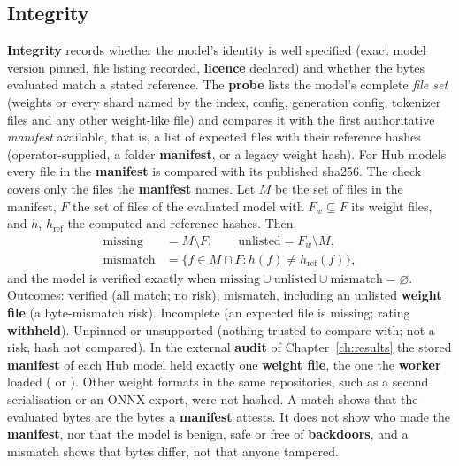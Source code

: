 \subsection{Integrity}\label{sec:integ}
\textbf{Integrity} records whether the model's identity is well specified (exact model version pinned, file listing recorded, \textbf{licence} declared) and whether the bytes evaluated match a stated reference. The \textbf{probe} lists the model's complete \emph{file set} (weights or every shard named by the index, config, generation config, tokenizer files and any other weight-like file) and compares it with the first authoritative \emph{manifest} available, that is, a list of expected files with their reference hashes (operator-supplied, a folder \textbf{manifest}, or a legacy weight hash). For Hub models every file in the \textbf{manifest} is compared with its published sha256. The check covers only the files the \textbf{manifest} names. Let $M$ be the set of files in the manifest, $F$ the set of files of the evaluated model with $F_w\subseteq F$ its weight files, and $h$, $h_{\mathrm{ref}}$ the computed and reference hashes. Then
\begin{align}
\text{missing}&=M\setminus F, \qquad \text{unlisted}=F_w\setminus M,\\
\text{mismatch}&=\{f\in M\cap F : h(f)\neq h_{\mathrm{ref}}(f)\},\label{eq:fileset}
\end{align}
and the model is verified exactly when $\text{missing}\cup\text{unlisted}\cup\text{mismatch}=\varnothing$. Outcomes: verified (all match; no risk); mismatch, including an unlisted \textbf{weight file} (a byte-mismatch risk). Incomplete (an expected file is missing; rating \textbf{withheld}). Unpinned or unsupported (nothing trusted to compare with; not a risk, hash not compared). In the external \textbf{audit} of Chapter~\ref{ch:results} the stored \textbf{manifest} of each Hub model held exactly one \textbf{weight file}, the one the \textbf{worker} loaded ( or ). Other weight formats in the same repositories, such as a second serialisation or an ONNX export, were not hashed. A match shows that the evaluated bytes are the bytes a \textbf{manifest} attests. It does not show who made the \textbf{manifest}, nor that the model is benign, safe or free of \textbf{backdoors}, and a mismatch shows that bytes differ, not that anyone tampered.


